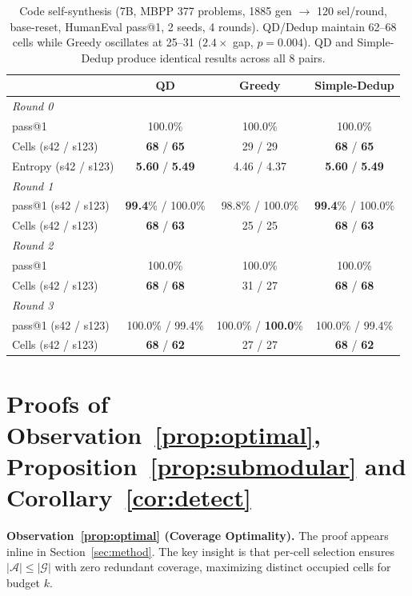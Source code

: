 \documentclass{article}
\theoremstyle{plain}
\theoremstyle{remark}
\begin{document}
\begin{table}[h]
\centering
\caption{Code self-synthesis (7B, MBPP 377 problems, 1885 gen $\to$ 120 sel/round, base-reset, HumanEval pass@1, 2 seeds, 4 rounds). QD/Dedup maintain 62--68 cells while Greedy oscillates at 25--31 ($2.4\times$ gap, $p{=}0.004$). QD and Simple-Dedup produce identical results across all 8 pairs.}
\label{tab:code_selfsynthesis}
\begin{tabular}{lccc}
\toprule
 & \textbf{QD} & \textbf{Greedy} & \textbf{Simple-Dedup} \\
\midrule
\multicolumn{4}{l}{\textit{Round 0}} \\
pass@1 & 100.0\% & 100.0\% & 100.0\% \\
Cells (s42 / s123) & \textbf{68} / \textbf{65} & 29 / 29 & \textbf{68} / \textbf{65} \\
Entropy (s42 / s123) & \textbf{5.60} / \textbf{5.49} & 4.46 / 4.37 & \textbf{5.60} / \textbf{5.49} \\
\midrule
\multicolumn{4}{l}{\textit{Round 1}} \\
pass@1 (s42 / s123) & \textbf{99.4}\% / 100.0\% & 98.8\% / 100.0\% & \textbf{99.4}\% / 100.0\% \\
Cells (s42 / s123) & \textbf{68} / \textbf{63} & 25 / 25 & \textbf{68} / \textbf{63} \\
\midrule
\multicolumn{4}{l}{\textit{Round 2}} \\
pass@1 & 100.0\% & 100.0\% & 100.0\% \\
Cells (s42 / s123) & \textbf{68} / \textbf{68} & 31 / 27 & \textbf{68} / \textbf{68} \\
\midrule
\multicolumn{4}{l}{\textit{Round 3}} \\
pass@1 (s42 / s123) & 100.0\% / 99.4\% & 100.0\% / \textbf{100.0}\% & 100.0\% / 99.4\% \\
Cells (s42 / s123) & \textbf{68} / \textbf{62} & 27 / 27 & \textbf{68} / \textbf{62} \\
\bottomrule
\end{tabular}
\end{table}

\section{Proofs of Observation~\ref{prop:optimal}, Proposition~\ref{prop:submodular} and Corollary~\ref{cor:detect}}
\label{sec:proof}

\textbf{Observation~\ref{prop:optimal} (Coverage Optimality).}
The proof appears inline in Section~\ref{sec:method}. The key insight is that per-cell selection ensures $|\mathcal{A}| \leq |\mathcal{G}|$ with zero redundant coverage, maximizing distinct occupied cells for budget $k$.
\end{document}

